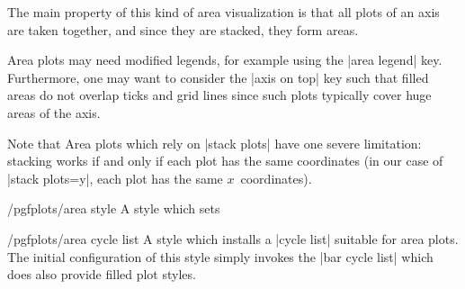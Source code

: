 {\begin{codeexample}[]
\end{codeexample}
\noindent The main property of this kind of area visualization is that all plots of an axis are taken together, and since they are stacked, they form areas.

\noindent
Area plots may need modified legends, for example using the |area legend| key. Furthermore, one may want to consider the |axis on top| key such that filled areas do not overlap ticks and grid lines since such plots typically cover huge areas of the axis. 

Note that Area plots which rely on |stack plots| have one severe limitation: stacking works if and only if each plot has the same coordinates (in our case of |stack plots=y|, each plot has the same $x$~coordinates).

\begin{stylekey}{/pgfplots/area style}
	A style which sets
\begin{codeexample}
\end{codeexample}
\end{stylekey}

\begin{stylekey}{/pgfplots/area cycle list}
	A style which installs a |cycle list| suitable for area plots. The initial configuration of this style simply invokes the |bar cycle list| which does also provide filled plot styles.
\end{stylekey}

\begin{codeexample}[]
\end{codeexample}

}
